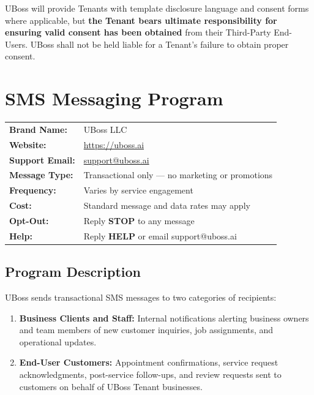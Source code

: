 \documentclass[11pt, letterpaper]{article}
\begin{document}
UBoss will provide Tenants with template disclosure language and consent forms where
applicable, but \textbf{the Tenant bears ultimate responsibility for ensuring valid
consent has been obtained} from their Third-Party End-Users. UBoss shall not be held
liable for a Tenant's failure to obtain proper consent.

\section{SMS Messaging Program}
\label{sec:sms}

\begin{tcolorbox}[keysummary, title={SMS Program At-a-Glance}]
\begin{tabularx}{\textwidth}{@{}>{\bfseries}l X@{}}
Brand Name:       & UBoss LLC \\
Website:          & \href{https://uboss.ai}{https://uboss.ai} \\
Support Email:    & \href{mailto:support@uboss.ai}{support@uboss.ai} \\
Message Type:     & Transactional only --- no marketing or promotions \\
Frequency:        & Varies by service engagement \\
Cost:             & Standard message and data rates may apply \\
Opt-Out:          & Reply \textbf{STOP} to any message \\
Help:             & Reply \textbf{HELP} or email support@uboss.ai \\
\end{tabularx}
\end{tcolorbox}

\subsection{Program Description}

UBoss sends transactional SMS messages to two categories of recipients:

\begin{enumerate}
    \item \textbf{Business Clients and Staff:} Internal notifications alerting business
          owners and team members of new customer inquiries, job assignments, and
          operational updates.

    \item \textbf{End-User Customers:} Appointment confirmations, service request
          acknowledgments, post-service follow-ups, and review requests sent to
          customers on behalf of UBoss Tenant businesses.
\end{enumerate}
\end{document}
